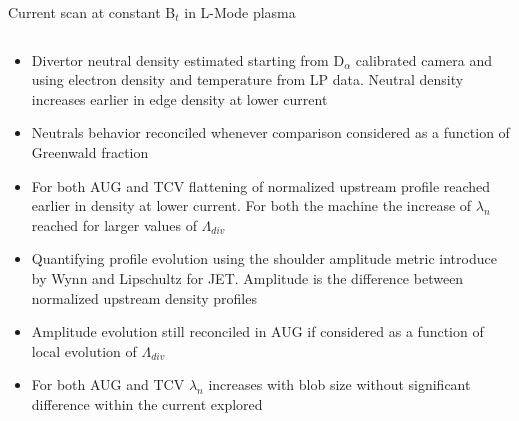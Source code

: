 \documentclass[10pt, compress]{beamer}
\begin{document}
\begin{frame}{Current scan at constant B$_t$ in L-Mode plasma}
\begin{columns}
\begin{column}{0.4\textwidth}
\begin{itemize}
          reached in all the three current,  although marginally at
          330 kA
        \item<4|only@4> Divertor neutral density estimated starting
          from D$_{\alpha}$ calibrated camera and using electron
          density and temperature from LP data. Neutral density
          increases earlier in edge density at lower current
        \item<5|only@5> Neutrals behavior reconciled whenever
          comparison considered as a function of Greenwald fraction  
        \item<6|only@6> For both AUG and TCV flattening of normalized
          upstream profile reached \alert{earlier in density at lower
            current.} For both the machine the increase of $\lambda_n$
          reached for larger values of $\Lambda_{div}$
        \item<7|only@7> Quantifying profile evolution using the
          \alert{shoulder amplitude metric} introduce by Wynn and
          Lipschultz for JET. \alert{Amplitude is the difference
            between normalized upstream density profiles}
        \item<10|only@10> Amplitude evolution still reconciled in AUG if
          considered as a function of local evolution of $\Lambda_{div}$
        \item<11|only@11> For both AUG and TCV $\lambda_n$ increases
          with blob size without significant difference within the
          current explored
      \end{itemize}
    \end{column}
  \end{columns}
\end{frame}  
\end{document}
